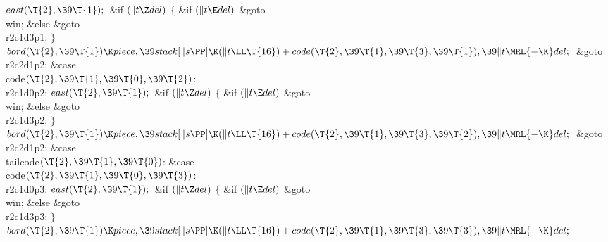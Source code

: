 ${}\\{east}(\T{2},\39\T{1});{}$\6
\&{if} ${}(\|t\Z\\{del}){}$\5
${}\{{}$\5
\1\&{if} ${}(\|t\E\\{del}){}$\1\5
\&{goto} \\{win};\5
\2\&{else}\1\5
\&{goto} \\{r2c1d3p1};\5
\2${}\}{}$\2\6
${}\\{bord}(\T{2},\39\T{1})\K\\{piece},\39\\{stack}[\|s\PP]\K(\|t\LL\T{16})+%
\\{code}(\T{2},\39\T{1},\39\T{3},\39\T{1}),\39\|t\MRL{-{\K}}\\{del};{}$\6
\&{goto} \\{r2c2d1p2};\6
\4\&{case} \\{code}${}(\T{2},\39\T{1},\39\T{0},\39\T{2}){}$:\5
\\{r2c1d0p2}:\5
${}\\{east}(\T{2},\39\T{1});{}$\6
\&{if} ${}(\|t\Z\\{del}){}$\5
${}\{{}$\5
\1\&{if} ${}(\|t\E\\{del}){}$\1\5
\&{goto} \\{win};\5
\2\&{else}\1\5
\&{goto} \\{r2c1d3p2};\5
\2${}\}{}$\2\6
${}\\{bord}(\T{2},\39\T{1})\K\\{piece},\39\\{stack}[\|s\PP]\K(\|t\LL\T{16})+%
\\{code}(\T{2},\39\T{1},\39\T{3},\39\T{2}),\39\|t\MRL{-{\K}}\\{del};{}$\6
\&{goto} \\{r2c2d1p2};\6
\4\&{case} \\{tailcode}${}(\T{2},\39\T{1},\39\T{0}){}$:\5
\&{case} \\{code}${}(\T{2},\39\T{1},\39\T{0},\39\T{3}){}$:\5
\\{r2c1d0p3}:\5
${}\\{east}(\T{2},\39\T{1});{}$\6
\&{if} ${}(\|t\Z\\{del}){}$\5
${}\{{}$\5
\1\&{if} ${}(\|t\E\\{del}){}$\1\5
\&{goto} \\{win};\5
\2\&{else}\1\5
\&{goto} \\{r2c1d3p3};\5
\2${}\}{}$\2\6
${}\\{bord}(\T{2},\39\T{1})\K\\{piece},\39\\{stack}[\|s\PP]\K(\|t\LL\T{16})+%
\\{code}(\T{2},\39\T{1},\39\T{3},\39\T{3}),\39\|t\MRL{-{\K}}\\{del};{}$\6
